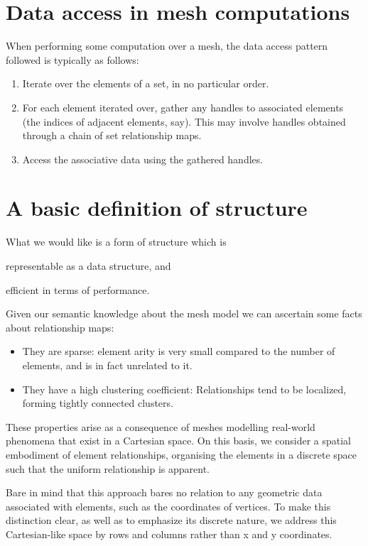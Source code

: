 \section{Data access in mesh computations}
When performing some computation over a mesh, the data access pattern followed is typically as follows:
\begin{enumerate}
\item Iterate over the elements of a set, in no particular order.
\item For each element iterated over, gather any handles to associated elements (the indices of adjacent elements, say). This may involve handles obtained through a chain of set relationship maps.
\item Access the associative data using the gathered handles.
\end{enumerate}



\section{A basic definition of structure}
What we would like is a form of structure which is
\begin{inparaenum}
\item representable as a data structure, and \item efficient in terms of performance.
\end{inparaenum}

Given our semantic knowledge about the mesh model we can ascertain some facts about relationship maps:
\begin{itemize}
\item They are sparse: element arity is very small compared to the number of elements, and is in fact unrelated to it.
\item They have a high clustering coefficient: Relationships tend to be localized, forming tightly connected clusters.
\end{itemize}

These properties arise as a consequence of meshes modelling real-world phenomena that exist in a Cartesian space.
On this basis, we consider a spatial embodiment of element relationships, organising the elements in a discrete space such that the uniform relationship is apparent.

Bare in mind that this approach bares no relation to any geometric data associated with elements, such as the coordinates of vertices. To make this distinction clear, as well as to emphasize its discrete nature, we address this Cartesian-like space by rows and columns rather than x and y coordinates.

